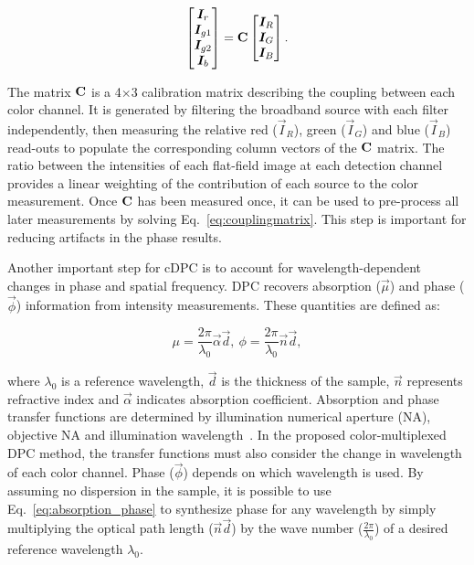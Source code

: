 \begin{equation}
\label{eq:couplingmatrix}
\begin{bmatrix}
\bm{I}_{r} \\
\bm{I}_{g1}\\
\bm{I}_{g2}\\
\bm{I}_{b}
\end{bmatrix}
 =
 \mathbf{C}
 \begin{bmatrix}
\bm{I}_{R} \\
\bm{I}_{G}\\
\bm{I}_{B}
\end{bmatrix}.
\end{equation}

\noindent  The matrix $\mathbf{C}$ is a 4$\times$3 calibration matrix describing the coupling between each color channel. It is generated by filtering the broadband source with each filter independently, then measuring the relative red ($\vec{I}_R$), green ($\vec{I}_G$) and blue ($\vec{I}_B$) read-outs to populate the corresponding column vectors of the $\mathbf{C}$ matrix. The ratio between the intensities of each flat-field image at each detection channel provides a linear weighting of the contribution of each source to the color measurement. Once $\mathbf{C}$ has been measured once, it can be used to pre-process all later measurements by solving Eq.~\eqref{eq:couplingmatrix}. This step is important for reducing artifacts in the phase results.

Another important step for cDPC is to account for wavelength-dependent changes in phase and spatial frequency. DPC recovers absorption ($\vec{\mu}$) and phase ($\vec{\phi}$) information from intensity measurements. These quantities are defined as:

\begin{equation}
\label{eq:absorption_phase}
\mu = \frac{2\pi}{\lambda_0} \vec{\alpha} \vec{d},\ \phi = \frac{2\pi}{\lambda_0} \vec{n} \vec{d},
\end{equation}

\noindent where $\lambda_0$ is a reference wavelength, $\vec{d}$ is the thickness of the sample, $\vec{n}$ represents refractive index and $\vec{\alpha}$ indicates absorption coefficient. Absorption and phase transfer functions are determined by illumination numerical aperture (NA), objective NA and illumination wavelength~\cite{tian2015quantitative}. In the proposed color-multiplexed DPC method, the transfer functions must also consider the change in wavelength of each color channel. Phase ($\vec{\phi}$) depends on which wavelength is used. By assuming no dispersion in the sample, it is possible to use Eq.~\eqref{eq:absorption_phase} to synthesize phase for any wavelength by simply multiplying the optical path length ($\vec{n}\vec{d}$) by the wave number ($\frac{2\pi}{\lambda_0}$) of a desired reference wavelength $\lambda_0$.


